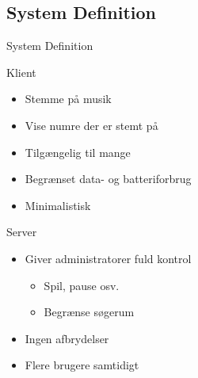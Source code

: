 \subsection{System Definition}
\begin{frame}{System Definition}
	\begin{multicols}{2}
		Klient
		\begin{itemize}
			\item Stemme på musik
			\item Vise numre der er stemt på
			\item Tilgængelig til mange
			\item Begrænset data- og batteriforbrug
			\item Minimalistisk
		\end{itemize}
		
		\columnbreak
		
		Server
		\begin{itemize}
			\item Giver administratorer fuld kontrol
			\begin{itemize}
				\item Spil, pause osv.
				\item Begrænse søgerum
			\end{itemize}
			\item Ingen afbrydelser
			\item Flere brugere samtidigt
		\end{itemize}
	\end{multicols}
\end{frame}
